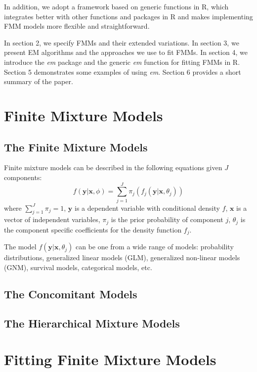 \documentclass[nojss]{jss}
\begin{document}
In addition, we adopt a framework based on generic functions in R, which integrates better with other functions and packages in R and makes implementing FMM models more flexible and straightforward.

In section 2, we specify FMMs and their extended variations. In section 3, we present EM algorithms and the approaches we use to fit FMMs. In section 4, we introduce the \emph{em} package and the generic \emph{em} function for fitting FMMs in R. Section 5 demonstrates some examples of using \emph{em}. Section 6 provides a short summary of the paper.   
   \section{Finite Mixture Models}
      \subsection{The Finite Mixture Models}
	      Finite mixture models can be described in the following equations given $J$ components:
      \begin{equation}
	      f(\mathbf{y}|\mathbf{x},\phi) = \sum_{j=1}^J \pi_j(f_j(\mathbf{y}|\mathbf{x}, \theta_j))
	    \end{equation}
	    where $\sum_{j=1}^J \pi_j = 1$,  $\mathbf{y}$ is a dependent variable with conditional density $f$,  $\mathbf{x}$ is a vector of independent variables, $\pi_j$ is the prior probability of component $j$,  $\theta_j$ is the component specific coefficients for the density function $f_j$.

The model $f(\mathbf{y}|\mathbf{x}, \theta_j)$ can be one from a wide range of models: probability distributions, generalized linear models (GLM), generalized non-linear models (GNM),  survival models,  categorical models, etc. %
      \subsection{The Concomitant Models}
      \subsection{The Hierarchical Mixture Models}
   \section{Fitting Finite Mixture Models}
\end{document}
